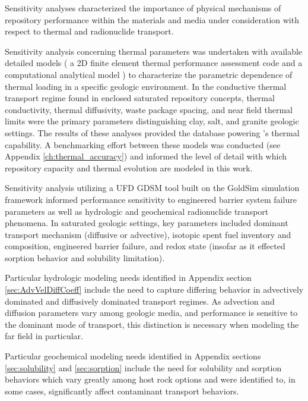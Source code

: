 Sensitivity analyses characterized the importance of physical mechanisms of 
repository performance  within the materials and media under consideration with 
respect to thermal and radionuclide transport.

Sensitivity analysis concerning thermal parameters was undertaken with available 
detailed models ( a 2D finite element thermal performance assessment code 
\cite{huff_benchmarking_2012, huff_numerical_2012} and a computational 
analytical model \cite{greenberg_application_2012}) to characterize the 
parametric dependence of thermal loading in a specific geologic environment.  In 
the conductive thermal transport regime found in enclosed saturated repository 
concepts, thermal conductivity, thermal diffusivity, waste package spacing, and 
near field thermal limits were the primary parameters distinguishing clay, salt, 
and granite geologic settings. The results of these analyses provided the 
database powering \Cyder's thermal capability. A benchmarking effort between 
these models was conducted (see Appendix \ref{ch:thermal_accuracy}) and informed 
the level of detail with which repository capacity and thermal evolution are 
modeled in this work.  

Sensitivity analysis utilizing a \gls{UFD} \gls{GDSM} tool built on the 
GoldSim simulation framework informed performance sensitivity to engineered 
barrier system failure parameters as well as hydrologic and geochemical 
radionuclide transport phenomena. In saturated geologic settings, key parameters 
included dominant transport mechanism (diffusive or 
advective), isotopic spent fuel inventory and composition, engineered barrier 
failure, and redox state (insofar as it effected sorption behavior and 
solubility limitation).

Particular hydrologic modeling needs identified in Appendix section 
\ref{sec:AdvVelDiffCoeff} include the need to capture 
differing behavior in advectively dominated and diffusively dominated transport 
regimes. As advection and diffusion parameters vary among geologic media, and 
performance is sensitive to the dominant mode of transport, this distinction is 
necessary when modeling the far field in particular.

Particular geochemical modeling needs identified in Appendix sections 
\ref{sec:solubility} and \ref{sec:sorption} include the need for solubility and 
sorption behaviors which vary greatly among host rock options and were 
identified to, in some cases, significantly affect contaminant transport 
behaviors. 

